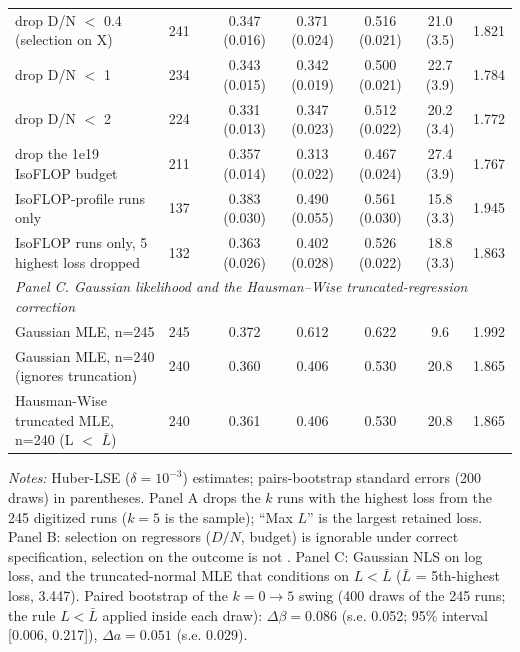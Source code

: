 \begin{table}[!htbp]
\begin{threeparttable}
\begin{tabular}{lccccccc}
drop D/N $<$ 0.4 (selection on X) & 241 &  & 0.347 (0.016) & 0.371 (0.024) & 0.516 (0.021) & 21.0 (3.5) & 1.821 \\
drop D/N $<$ 1 & 234 &  & 0.343 (0.015) & 0.342 (0.019) & 0.500 (0.021) & 22.7 (3.9) & 1.784 \\
drop D/N $<$ 2 & 224 &  & 0.331 (0.013) & 0.347 (0.023) & 0.512 (0.022) & 20.2 (3.4) & 1.772 \\
drop the 1e19 IsoFLOP budget & 211 &  & 0.357 (0.014) & 0.313 (0.022) & 0.467 (0.024) & 27.4 (3.9) & 1.767 \\
IsoFLOP-profile runs only & 137 &  & 0.383 (0.030) & 0.490 (0.055) & 0.561 (0.030) & 15.8 (3.3) & 1.945 \\
IsoFLOP runs only, 5 highest loss dropped & 132 &  & 0.363 (0.026) & 0.402 (0.028) & 0.526 (0.022) & 18.8 (3.3) & 1.863 \\
\multicolumn{8}{l}{\textit{Panel C. Gaussian likelihood and the Hausman--Wise truncated-regression correction}} \\
Gaussian MLE, n=245 & 245 &  & 0.372 & 0.612 & 0.622 & 9.6 & 1.992 \\
Gaussian MLE, n=240 (ignores truncation) & 240 &  & 0.360 & 0.406 & 0.530 & 20.8 & 1.865 \\
Hausman-Wise truncated MLE, n=240 (L $<$ $\bar L$) & 240 &  & 0.361 & 0.406 & 0.530 & 20.8 & 1.865 \\
\bottomrule
\end{tabular}
\begin{tablenotes}[flushleft]
\footnotesize
\item \textit{Notes:} Huber-LSE ($\delta=10^{-3}$) estimates; pairs-bootstrap standard errors (200 draws) in parentheses. Panel A drops the $k$ runs with the highest loss from the 245 digitized runs ($k=5$ is the \citet{besiroglu2024chinchilla} sample); ``Max $L$'' is the largest retained loss. Panel B: selection on regressors ($D/N$, budget) is ignorable under correct specification, selection on the outcome is not \citep{hausman1977social}. Panel C: Gaussian NLS on log loss, and the truncated-normal MLE that conditions on $L<\bar L$ ($\bar L$ = 5th-highest loss, 3.447). Paired bootstrap of the $k=0\to5$ swing (400 draws of the 245 runs; the rule $L<\bar L$ applied inside each draw): $\Delta\beta=0.086$ (s.e. 0.052; 95\% interval [0.006, 0.217]), $\Delta a=0.051$ (s.e. 0.029).
\end{tablenotes}
\end{threeparttable}
\end{table}
